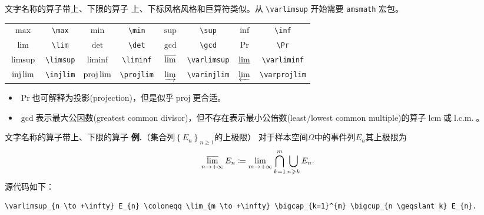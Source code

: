 \documentclass[mathserif]{beamer}
\newcommand{\codegreen}[1]{\textcolor{codegreen}{#1}}
\newenvironment{instance}{\zihao{-5}\textbf{\songti \codegreen{例.}}}{\hfill\par}
\begin{document}
\begin{frame}[fragile]{文字名称的算子}{带上、下限的算子}
上、下标风格风格和巨算符类似。从 \lstinline'\varlimsup' 开始需要 \verb'amsmath' 宏包。

\begin{table}[H]
\centering
\begin{tabular}{cc|cc|cc|cc}
	\toprule
	$\max$ & \lstinline'\max' & $\min$ & \lstinline'\min' & $\sup$ & \lstinline'\sup' & $\inf$ & \lstinline'\inf' \\
	$\lim$ & \lstinline'\lim' & $\det$ & \lstinline'\det' & $\gcd$ & \lstinline'\gcd' & $\Pr$ & \lstinline'\Pr' \\
	$\limsup$ & \lstinline'\limsup' & $\liminf$ & \lstinline'\liminf' & $\varlimsup$ & \lstinline'\varlimsup' & $\varliminf$ & \lstinline'\varliminf' \\
	$\injlim$ & \lstinline'\injlim' & $\projlim$ & \lstinline'\projlim' & $\varinjlim$ & \lstinline'\varinjlim' & $\varprojlim$ & \lstinline'\varprojlim' \\
	\bottomrule
\end{tabular}
\end{table}
\begin{itemize}

\item $\Pr$也可解释为投影(projection)，但是似乎$\operatorname{proj}$更合适。

\item $\gcd$表示最大公因数(greatest common divisor)，但不存在表示最小公倍数(least/lowest common multiple)的算子$\operatorname{lcm}$或$\operatorname{l.c.m.}$。

\end{itemize}
\end{frame}

\begin{frame}[fragile]{文字名称的算子}{带上、下限的算子}
\begin{instance}（集合列$\left\{ E_{n} \right\}_{n \geqslant 1}$的上极限）
对于样本空间$\varOmega$中的事件列$E_{n}$其上极限为
\begin{equation*}\label{eq:limsup}
	\varlimsup_{n \to +\infty} E_{n} \coloneqq \lim_{m \to +\infty} \bigcap_{k=1}^{m} \bigcup_{n \geqslant k} E_{n}.
\end{equation*}
源代码如下：
\begin{lstlisting}[numbers=none]
	\varlimsup_{n \to +\infty} E_{n} \coloneqq \lim_{m \to +\infty} \bigcap_{k=1}^{m} \bigcup_{n \geqslant k} E_{n}.
\end{lstlisting}
\end{instance}
\end{frame}
\end{document}
